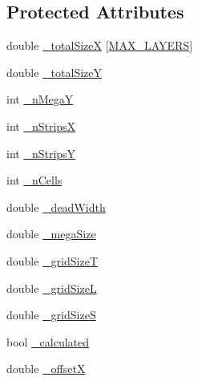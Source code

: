 \subsection*{Protected Attributes}
\begin{DoxyCompactItemize}
\item 
double \hyperlink{class_d_d4hep_1_1_d_d_segmentation_1_1_megatile_layer_grid_x_y_aa99372ea774b35c1c17cee61d9afbef2}{\+\_\+total\+SizeX} \mbox{[}\hyperlink{_megatile_layer_grid_x_y_8h_ade9d4b2ac5f29fe89ffea40e7c58c9d6}{M\+A\+X\+\_\+\+L\+A\+Y\+E\+RS}\mbox{]}
\item 
double \hyperlink{class_d_d4hep_1_1_d_d_segmentation_1_1_megatile_layer_grid_x_y_a872eaf618286c808f1cb93e7756a6c7c}{\+\_\+total\+SizeY}
\item 
int \hyperlink{class_d_d4hep_1_1_d_d_segmentation_1_1_megatile_layer_grid_x_y_afbd476c007a88c207aa09e12b43c8be7}{\+\_\+n\+MegaY}
\item 
int \hyperlink{class_d_d4hep_1_1_d_d_segmentation_1_1_megatile_layer_grid_x_y_a34d0954062dab57ef3ce16b3fc5021fe}{\+\_\+n\+StripsX}
\item 
int \hyperlink{class_d_d4hep_1_1_d_d_segmentation_1_1_megatile_layer_grid_x_y_a7d809f0a8f30db5a803be80e2ca833a6}{\+\_\+n\+StripsY}
\item 
int \hyperlink{class_d_d4hep_1_1_d_d_segmentation_1_1_megatile_layer_grid_x_y_a5bfd46085fb8a5db80e1333d47230505}{\+\_\+n\+Cells}
\item 
double \hyperlink{class_d_d4hep_1_1_d_d_segmentation_1_1_megatile_layer_grid_x_y_ab000179caddbb6a3ae67595b9bf87ba4}{\+\_\+dead\+Width}
\item 
double \hyperlink{class_d_d4hep_1_1_d_d_segmentation_1_1_megatile_layer_grid_x_y_af1dd67aeaebfeb9a9c5fbd268df8dbc5}{\+\_\+mega\+Size}
\item 
double \hyperlink{class_d_d4hep_1_1_d_d_segmentation_1_1_megatile_layer_grid_x_y_a73e8bf85c016511dedb6a892ef543163}{\+\_\+grid\+SizeT}
\item 
double \hyperlink{class_d_d4hep_1_1_d_d_segmentation_1_1_megatile_layer_grid_x_y_a463d0f581c8d384c7ed95cb4e350afd9}{\+\_\+grid\+SizeL}
\item 
double \hyperlink{class_d_d4hep_1_1_d_d_segmentation_1_1_megatile_layer_grid_x_y_a3a86080381739af95c9cb175fc25a5f5}{\+\_\+grid\+SizeS}
\item 
bool \hyperlink{class_d_d4hep_1_1_d_d_segmentation_1_1_megatile_layer_grid_x_y_a3330c7077781b90cd4d8a780de205960}{\+\_\+calculated}
\item 
double \hyperlink{class_d_d4hep_1_1_d_d_segmentation_1_1_megatile_layer_grid_x_y_a70c7ce913e3a2038712e9f46e8a6cfb1}{\+\_\+offsetX}

\end{DoxyCompactItemize}

